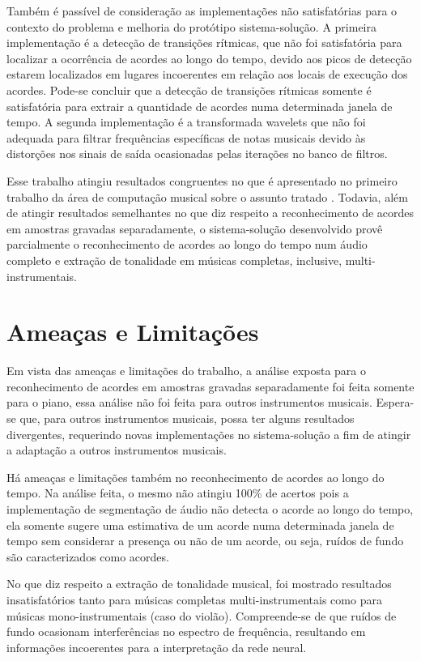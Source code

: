 Também é passível de consideração as implementações não satisfatórias para o contexto do problema e melhoria do protótipo sistema-solução. A primeira implementação é a detecção de transições rítmicas, que não foi satisfatória para localizar a ocorrência de acordes ao longo do tempo, devido aos picos de detecção estarem localizados em lugares incoerentes em relação aos locais de execução dos acordes. Pode-se concluir que a detecção de transições rítmicas somente é satisfatória para extrair a quantidade de acordes numa determinada janela de tempo. A segunda implementação é a transformada wavelets que não foi adequada para filtrar frequências específicas de notas musicais devido às distorções nos sinais de saída ocasionadas pelas iterações no banco de filtros.

Esse trabalho atingiu resultados congruentes no que é apresentado no primeiro trabalho da área de computação musical sobre o assunto tratado \cite{fujishima1999realtime}. Todavia, além de atingir resultados semelhantes no que diz respeito a reconhecimento de acordes em amostras gravadas separadamente, o sistema-solução desenvolvido provê parcialmente o reconhecimento de acordes ao longo do tempo num áudio completo e extração de tonalidade em músicas completas, inclusive, multi-instrumentais.

\section{Ameaças e Limitações}

Em vista das ameaças e limitações do trabalho, a análise exposta para o reconhecimento de acordes em amostras gravadas separadamente foi feita somente para o piano, essa análise não foi feita para outros instrumentos musicais. Espera-se que, para outros instrumentos musicais, possa ter alguns resultados divergentes, requerindo novas implementações no sistema-solução a fim de atingir a adaptação a outros instrumentos musicais.

Há ameaças e limitações também no reconhecimento de acordes ao longo do tempo. Na análise feita, o mesmo não atingiu 100\% de acertos pois a implementação de segmentação de áudio não detecta o acorde ao longo do tempo, ela somente sugere uma estimativa de um acorde numa determinada janela de tempo sem considerar a presença ou não de um acorde, ou seja, ruídos de fundo são caracterizados como acordes.

No que diz respeito a extração de tonalidade musical, foi mostrado resultados insatisfatórios tanto para músicas completas multi-instrumentais como para músicas mono-instrumentais (caso do violão). Compreende-se de que ruídos de fundo ocasionam interferências no espectro de frequência, resultando em informações incoerentes para a interpretação da rede neural.


